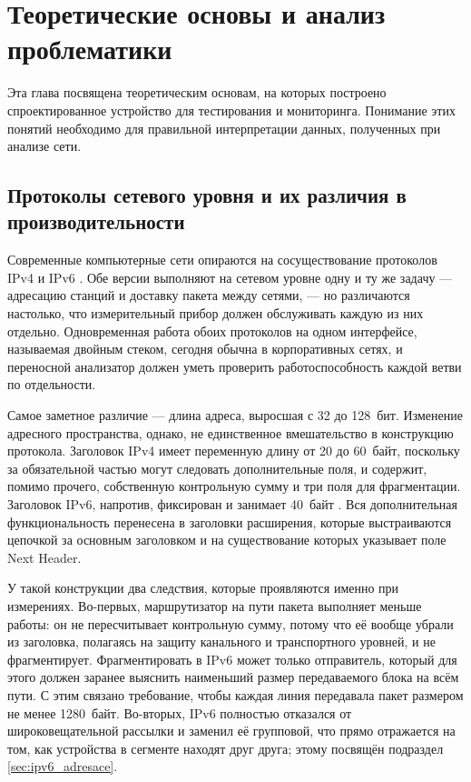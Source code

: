 \chapter{Теоретические основы и анализ проблематики}
\label{sec:teorie}

Эта глава посвящена теоретическим основам, на которых построено спроектированное устройство для тестирования и мониторинга. Понимание этих понятий необходимо для правильной интерпретации данных, полученных при анализе сети.

\section{Протоколы сетевого уровня и их различия в производительности}
\label{sec:ipv4_ipv6}

Современные компьютерные сети опираются на сосуществование протоколов IPv4 и IPv6 \cite{nastase2024}. Обе версии выполняют на сетевом уровне одну и ту же задачу — адресацию станций и доставку пакета между сетями, — но различаются настолько, что измерительный прибор должен обслуживать каждую из них отдельно. Одновременная работа обоих протоколов на одном интерфейсе, называемая двойным стеком, сегодня обычна в корпоративных сетях, и переносной анализатор должен уметь проверить работоспособность каждой ветви по отдельности.

Самое заметное различие — длина адреса, выросшая с 32 до 128~бит. Изменение адресного пространства, однако, не единственное вмешательство в конструкцию протокола. Заголовок IPv4 имеет переменную длину от 20 до 60~байт, поскольку за обязательной частью могут следовать дополнительные поля, и содержит, помимо прочего, собственную контрольную сумму и три поля для фрагментации. Заголовок IPv6, напротив, фиксирован и занимает 40~байт \cite{rfc8200}. Вся дополнительная функциональность перенесена в заголовки расширения, которые выстраиваются цепочкой за основным заголовком и на существование которых указывает поле Next Header.

У такой конструкции два следствия, которые проявляются именно при измерениях. Во-первых, маршрутизатор на пути пакета выполняет меньше работы: он не пересчитывает контрольную сумму, потому что её вообще убрали из заголовка, полагаясь на защиту канального и транспортного уровней, и не фрагментирует. Фрагментировать в IPv6 может только отправитель, который для этого должен заранее выяснить наименьший размер передаваемого блока на всём пути. С этим связано требование, чтобы каждая линия передавала пакет размером не менее 1280~байт. Во-вторых, IPv6 полностью отказался от широковещательной рассылки и заменил её групповой, что прямо отражается на том, как устройства в сегменте находят друг друга; этому посвящён подраздел \ref{sec:ipv6_adresace}.

